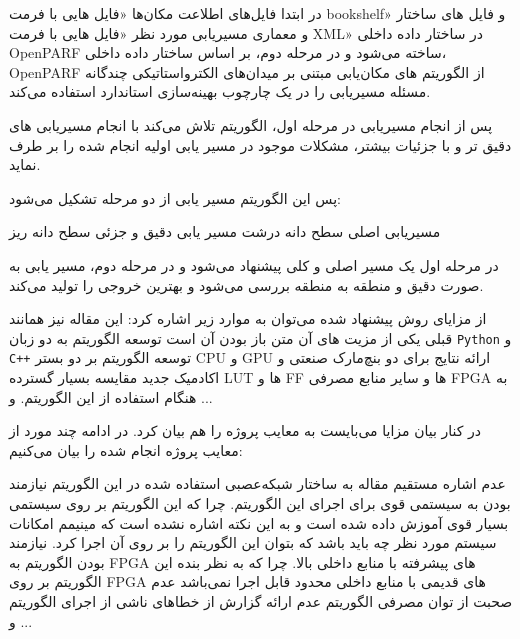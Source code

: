 در ابتدا فایل‌های اطلاعت مکان‌ها «فایل هایی با فرمت bookshelf» و فایل های ساختار و معماری مسیر‌یابی مورد نظر «فایل هایی با فرمت XML» در ساختار داده داخلی OpenPARF ساخته می‌شود و در مرحله دوم، بر اساس ساختار داده داخلی، OpenPARF از الگوریتم های مکان‌یابی مبتنی بر میدان‌های الکترو‌استاتیکی چندگانه مسئله مسیر‌یابی را در یک چارچوب بهینه‌سازی استاندارد استفاده می‌کند.

پس از انجام مسیریابی در مرحله اول، الگوریتم تلاش می‌کند با انجام مسیریابی های دقیق تر و با جزئیات بیشتر، مشکلات موجود در مسیر یابی اولیه انجام شده را بر طرف نماید.

پس این الگوریتم مسیر یابی از دو مرحله تشکیل می‌شود:

 مسیریابی اصلی سطح دانه درشت
 مسیر یابی دقیق و جزئی سطح دانه ریز

در مرحله اول یک مسیر اصلی و کلی پیشنهاد می‌شود و در مرحله دوم، مسیر یابی به صورت دقیق و منطقه به منطقه بررسی می‌شود و بهترین خروجی را تولید می‌کند.






از مزایای روش پیشنهاد شده می‌توان به موارد زیر اشاره کرد:
 این مقاله نیز همانند قبلی یکی از مزیت های آن متن باز بودن آن است
 توسعه الگوریتم به دو زبان \texttt{Python} و \texttt{C++} 
 توسعه الگوریتم بر دو بستر CPU و GPU
 ارائه نتایج برای دو بنچ‌مارک صنعتی و اکادمیک جدید
 مقایسه بسیار گسترده LUT ها و FF ها و سایر منابع مصرفی FPGA به هنگام استفاده از این الگوریتم.
 و ...

در کنار بیان مزایا می‌بایست به معایب پروژه را هم بیان کرد. در ادامه چند مورد از معایب پروژه انجام شده را بیان می‌کنیم:

 عدم اشاره مستقیم مقاله به ساختار شبکه‌عصبی استفاده شده در این الگوریتم
 نیازمند بودن به سیستمی قوی برای اجرای این الگوریتم. چرا که این الگوریتم بر روی سیستمی بسیار قوی آموزش داده شده است و به این نکته اشاره نشده است که مینیمم امکانات سیستم مورد نظر چه باید باشد که بتوان این الگوریتم را بر روی آن اجرا کرد.
 نیازمند بودن الگوریتم به FPGA های پیشرفته با منابع داخلی بالا. چرا که به نظر بنده این الگوریتم بر روی FPGA های قدیمی با منابع داخلی محدود قابل اجرا نمی‌باشد
 عدم صحبت از توان مصرفی الگوریتم
 عدم ارائه گزارش از خطا‌های ناشی از اجرای الگوریتم
 و ...







